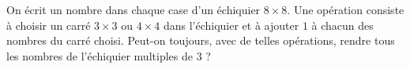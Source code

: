 On écrit un nombre dans chaque case d'un échiquier $8 \times 8$. Une opération consiste à choisir un carré $3 \times 3$ ou $4 \times 4$ dans l'échiquier et à ajouter $1$ à chacun des nombres du carré choisi. Peut-on toujours, avec de telles opérations, rendre tous les nombres de l'échiquier multiples de $3$ ?
